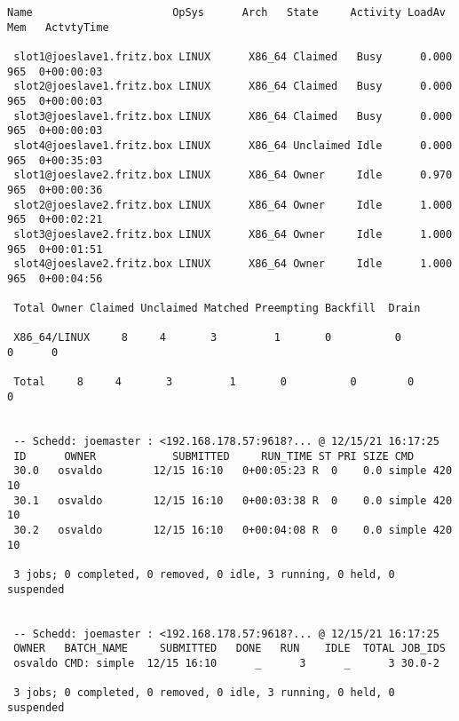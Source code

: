 \begin{lstlisting}[style=output_tiny]
 Name                      OpSys      Arch   State     Activity LoadAv Mem   ActvtyTime
 
 slot1@joeslave1.fritz.box LINUX      X86_64 Claimed   Busy      0.000  965  0+00:00:03
 slot2@joeslave1.fritz.box LINUX      X86_64 Claimed   Busy      0.000  965  0+00:00:03
 slot3@joeslave1.fritz.box LINUX      X86_64 Claimed   Busy      0.000  965  0+00:00:03
 slot4@joeslave1.fritz.box LINUX      X86_64 Unclaimed Idle      0.000  965  0+00:35:03
 slot1@joeslave2.fritz.box LINUX      X86_64 Owner     Idle      0.970  965  0+00:00:36
 slot2@joeslave2.fritz.box LINUX      X86_64 Owner     Idle      1.000  965  0+00:02:21
 slot3@joeslave2.fritz.box LINUX      X86_64 Owner     Idle      1.000  965  0+00:01:51
 slot4@joeslave2.fritz.box LINUX      X86_64 Owner     Idle      1.000  965  0+00:04:56
 
 Total Owner Claimed Unclaimed Matched Preempting Backfill  Drain
 
 X86_64/LINUX     8     4       3         1       0          0        0      0
 
 Total     8     4       3         1       0          0        0      0
 
 
 -- Schedd: joemaster : <192.168.178.57:9618?... @ 12/15/21 16:17:25
 ID      OWNER            SUBMITTED     RUN_TIME ST PRI SIZE CMD
 30.0   osvaldo        12/15 16:10   0+00:05:23 R  0    0.0 simple 420 10
 30.1   osvaldo        12/15 16:10   0+00:03:38 R  0    0.0 simple 420 10
 30.2   osvaldo        12/15 16:10   0+00:04:08 R  0    0.0 simple 420 10
 
 3 jobs; 0 completed, 0 removed, 0 idle, 3 running, 0 held, 0 suspended
 
 
 -- Schedd: joemaster : <192.168.178.57:9618?... @ 12/15/21 16:17:25
 OWNER   BATCH_NAME     SUBMITTED   DONE   RUN    IDLE  TOTAL JOB_IDS
 osvaldo CMD: simple  12/15 16:10      _      3      _      3 30.0-2
 
 3 jobs; 0 completed, 0 removed, 0 idle, 3 running, 0 held, 0 suspended

 
\end{lstlisting}
